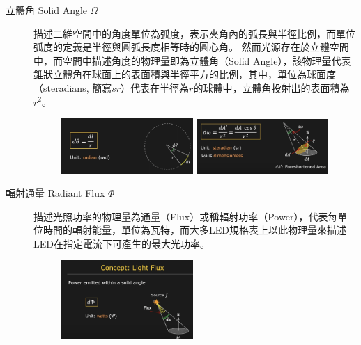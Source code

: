         
        \begin{description}
            \item[立體角 Solid Angle $\Omega$] \hfill
                
                描述二維空間中的角度單位為弧度，表示夾角內的弧長與半徑比例，而單位弧度的定義是半徑與圓弧長度相等時的圓心角。
                然而光源存在於立體空間中，而空間中描述角度的物理量即為立體角（Solid Angle），該物理量代表錐狀立體角在球面上的表面積與半徑平方的比例，其中，單位為球面度（steradians, 簡寫$sr$）代表在半徑為$r$的球體中，立體角投射出的表面積為$r^2$。

                \begin{figure}[ht]
                    \centering
                    \includegraphics[width=5cm]{00temppic/1.png}
                    \includegraphics[width=5cm]{00temppic/2.png}
                \end{figure}

            \item[輻射通量 Radiant Flux $\Phi$]  \hfill
                
                描述光照功率的物理量為通量（Flux）或稱輻射功率（Power），代表每單位時間的輻射能量，單位為瓦特，而大多LED規格表上以此物理量來描述LED在指定電流下可產生的最大光功率。

                \begin{figure}[ht]
                    \centering
                    \includegraphics[width=5cm]{00temppic/3.png}
                \end{figure}


\end{description}
